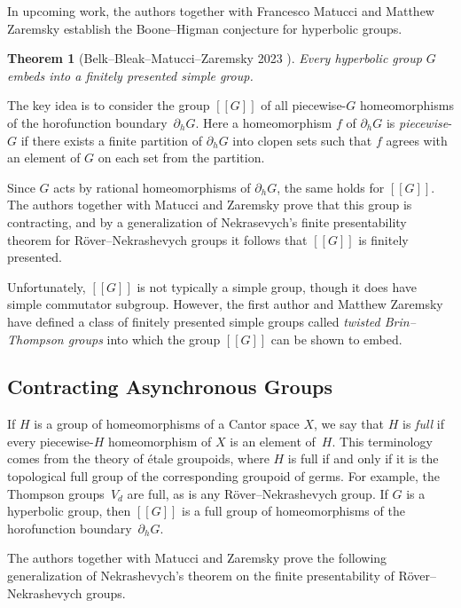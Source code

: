 \documentclass[usenames,dvipsnames]{amsart}
\newtheorem{theorem}{Theorem}[section]
\theoremstyle{definition}
\begin{document}
In upcoming work, the authors together with Francesco Matucci and Matthew Zaremsky establish the Boone--Higman conjecture for hyperbolic groups.

\begin{theorem}[Belk--Bleak--Matucci--Zaremsky 2023 \cite{BelkBleakMatucciZaremsky}]
Every hyperbolic group $G$ embeds into a finitely presented simple group.
\end{theorem}

The key idea is to consider the group $[[G]]$ of all piecewise-$G$ homeomorphisms of the horofunction boundary~$\partial_h G$.  Here a homeomorphism $f$ of $\partial_h G$ is \textit{piecewise}-$G$ if there exists a finite partition of $\partial_h G$ into clopen sets such that $f$ agrees with an element of $G$ on each set from the partition.

Since $G$ acts by rational homeomorphisms of $\partial_h G$, the same holds for $[[G]]$.  The authors together with Matucci and Zaremsky prove that this group is contracting, and by a generalization of Nekrasevych's finite presentability theorem for R\"over--Nekrashevych groups it follows that $[[G]]$ is finitely presented.

Unfortunately, $[[G]]$ is not typically a simple group, though it does have simple commutator subgroup.  However, the first author and Matthew Zaremsky have defined a class of finitely presented simple groups called \textit{twisted Brin--Thompson groups} \cite{BelkZaremskyTwisted} into which the group $[[G]]$ can be shown to embed.

\subsection{Contracting Asynchronous Groups}

If $H$ is a group of homeomorphisms of a Cantor space $X$, we say that $H$ is \textit{full} if every piecewise-$H$ homeomorphism of $X$ is an element of~$H$.  This terminology comes from the theory of \'etale groupoids, where $H$ is full if and only if it is the topological full group of the corresponding groupoid of germs.  For example, the Thompson groups~$V_d$ are full, as is any R\"over--Nekrashevych group.  If $G$ is a hyperbolic group, then $[[G]]$ is a full group of homeomorphisms of the horofunction boundary~$\partial_h G$.

The authors together with Matucci and Zaremsky prove the following generalization of Nekrashevych's theorem on the finite presentability of R\"over--Nekrashevych groups.
\end{document}

